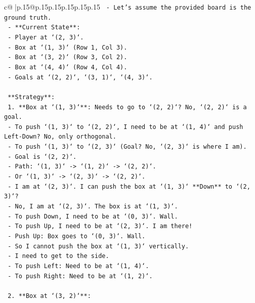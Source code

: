 \documentclass{article}
\begin{document}
{\begin{supertabular}{c@{$\;$}|p{.15\linewidth}@{}p{.15\linewidth}p{.15\linewidth}p{.15\linewidth}p{.15\linewidth}p{.15\linewidth}}
{{{\texttt{        {-} Let's assume the provided board is the ground truth.} \\
\texttt{        {-} **Current State**:} \\
\texttt{          {-} Player at `(2, 3)`.} \\
\texttt{          {-} Box at `(1, 3)` (Row 1, Col 3).} \\
\texttt{          {-} Box at `(3, 2)` (Row 3, Col 2).} \\
\texttt{          {-} Box at `(4, 4)` (Row 4, Col 4).} \\
\texttt{          {-} Goals at `(2, 2)`, `(3, 1)`, `(4, 3)`.} \\
\\ 
\texttt{      **Strategy**:} \\
\texttt{      1.  **Box at `(1, 3)`**: Needs to go to `(2, 2)`? No, `(2, 2)` is a goal.} \\
\texttt{          {-} To push `(1, 3)` to `(2, 2)`, I need to be at `(1, 4)` and push Left{-}Down? No, only orthogonal.} \\
\texttt{          {-} To push `(1, 3)` to `(2, 3)` (Goal? No, `(2, 3)` is where I am).} \\
\texttt{          {-} Goal is `(2, 2)`.} \\
\texttt{          {-} Path: `(1, 3)` {-}> `(1, 2)` {-}> `(2, 2)`.} \\
\texttt{          {-} Or `(1, 3)` {-}> `(2, 3)` {-}> `(2, 2)`.} \\
\texttt{          {-} I am at `(2, 3)`. I can push the box at `(1, 3)` **Down** to `(2, 3)`?} \\
\texttt{          {-} No, I am at `(2, 3)`. The box is at `(1, 3)`.} \\
\texttt{          {-} To push Down, I need to be at `(0, 3)`. Wall.} \\
\texttt{          {-} To push Up, I need to be at `(2, 3)`. I am there!} \\
\texttt{          {-} Push Up: Box goes to `(0, 3)`. Wall.} \\
\texttt{          {-} So I cannot push the box at `(1, 3)` vertically.} \\
\texttt{          {-} I need to get to the side.} \\
\texttt{          {-} To push Left: Need to be at `(1, 4)`.} \\
\texttt{          {-} To push Right: Need to be at `(1, 2)`.} \\
\\ 
\texttt{      2.  **Box at `(3, 2)`**:} \\
}}}
\end{supertabular}}
\end{document}
